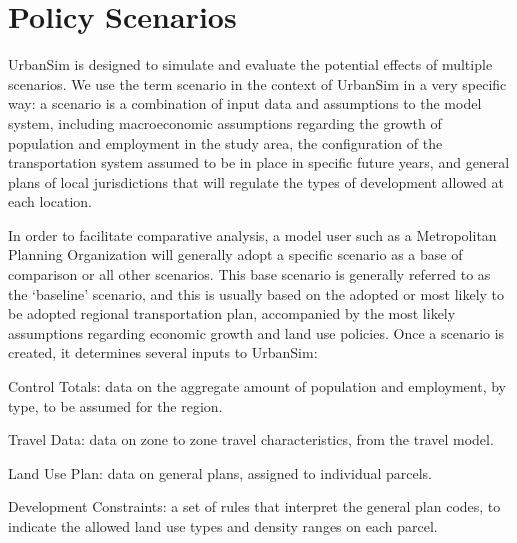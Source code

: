 \section{Policy Scenarios}

UrbanSim is designed to simulate and evaluate the potential effects of multiple scenarios.  We use the term scenario in the context of UrbanSim in a very
specific way: a scenario is a combination of input data and assumptions to the model system, including macroeconomic assumptions regarding the growth of population and employment in the study area, the configuration of the transportation system assumed to be in place in specific future years, and
general plans of local jurisdictions that will regulate the types of development allowed at each location.

In order to facilitate comparative analysis, a model user such as a Metropolitan Planning Organization will generally adopt a specific scenario as a base of comparison or all other scenarios.  This base scenario is generally referred to as the `baseline' scenario, and this is usually based on the adopted or most
likely to be adopted regional transportation plan, accompanied by the most likely assumptions regarding economic growth and land use policies.  Once a  scenario is created, it determines several inputs to UrbanSim:

\squishlist
\item Control Totals: data on the aggregate amount of population and employment, by type, to be assumed for the region.
\item Travel Data: data on zone to zone travel characteristics, from the travel model.
\item Land Use Plan: data on general plans, assigned to individual parcels.
\item Development Constraints: a set of rules that interpret the general plan codes, to indicate the allowed land use types and density ranges on each parcel.
\squishend

